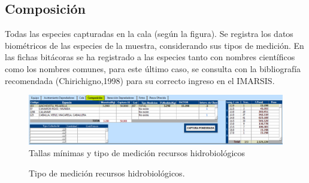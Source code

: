 \documentclass[a4paper,oneside,11pt]{book}
\begin{document}
\subsection{Composición}
Todas las especies capturadas en la cala (según la figura). Se registra los datos biométricos de las especies de la muestra, considerando sus tipos de medición. En las fichas bitácoras se ha registrado a las especies tanto con nombres científicos como los nombres comunes, para este último caso, se consulta con la bibliografía recomendada (Chirichigno,1998) para su correcto ingreso en el IMARSIS. 
\begin{figure}
\centering
\includegraphics[width=1\linewidth]{./imagen_Manual_PBP/comp}
\caption{Tallas mínimas y tipo de medición recursos hidrobiológicos}
\label{fig:comp} 
\end{figure}
\begin{figure}[htbp]
 	\centering
  	\caption{Tipo de medición recursos hidrobiológicos.}
 	\vspace{-20pt}
 \end{figure}
 
\end{document}
